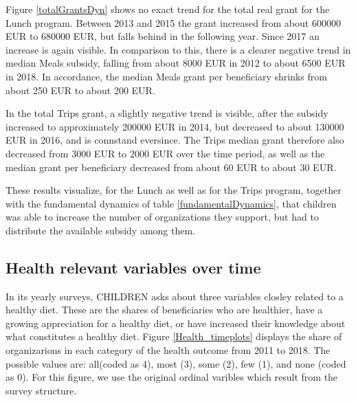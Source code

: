 \documentclass[12pt, a4paper, titlepage]{article}\usepackage[]{graphicx}\usepackage[]{color}
\begin{document}
Figure \ref{totalGrantsDyn} shows no exact trend for the total real grant for the Lunch program. Between 2013 and 2015 the grant increased from about 600000 EUR to 680000 EUR, but falls behind in the following year. Since 2017 an increase is again visible. In comparison to this, there is a clearer negative trend in median Meals subsidy, falling from about 8000 EUR in 2012 to about 6500 EUR in 2018. In accordance, the median Meals grant per beneficiary shrinks from about 250 EUR to about 200 EUR. 

In the total Trips grant, a slightly negative trend is visible, after the subsidy increased to approximately 200000 EUR in 2014, but decreased to about 130000 EUR in 2016, and is connstand eversince. The Trips median grant therefore also decreased from 3000 EUR to 2000 EUR over the time period, as well as the median grant per beneficiary decreased from about 60 EUR to about 30 EUR.

These results visualize, for the Lunch as well as for the Trips program, together with the fundamental dynamics of table \ref{fundamentalDynamics}, that children was able to increase the number of organizations they support, but had to distribute the available subsidy among them. 

\subsection{Health relevant variables over time} 

In its yearly surveys, CHILDREN asks about three variables closley related to a healthy diet. These are the shares of beneficiaries who are healthier, have a growing appreciation for a healthy diet, or have increased their knowledge about what constitutes a healthy diet. Figure \ref{Health_timeplots} displays the share of organizarions in each category of the health outcome from 2011 to 2018. The possible values are: all(coded as 4), most (3), some (2), few (1), and none (coded as 0). For this figure, we use the original ordinal varibles which result from the survey structure.  
\end{document}
